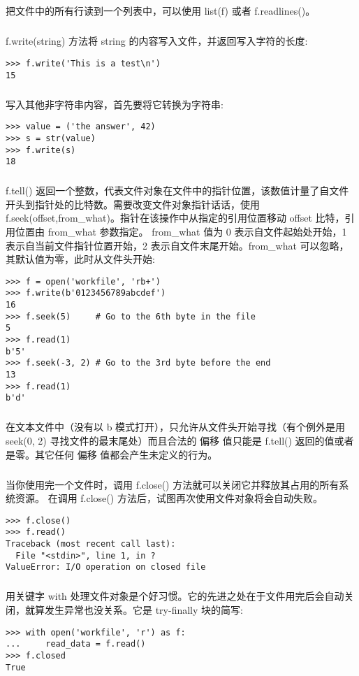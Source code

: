 \documentclass{article}
\begin{document}
\begin{CJK}{UTF8}{gbsn}
\begin{verbatim}
\end{verbatim}
\subparagraph*{}
把文件中的所有行读到一个列表中，可以使用 list(f) 或者 f.readlines()。
\subparagraph*{}
f.write(string) 方法将 string 的内容写入文件，并返回写入字符的长度:
\begin{verbatim}
>>> f.write('This is a test\n')
15
\end{verbatim}
\subparagraph*{}
写入其他非字符串内容，首先要将它转换为字符串:
\begin{verbatim}
>>> value = ('the answer', 42)
>>> s = str(value)
>>> f.write(s)
18
\end{verbatim}
\subparagraph*{}
f.tell() 返回一个整数，代表文件对象在文件中的指针位置，该数值计量了自文件开头到指针处的比特数。需要改变文件对象指针话话，使用 f.seek(offset,from\_{}what)。指针在该操作中从指定的引用位置移动 offset 比特，引用位置由 from\_{}what 参数指定。 from\_{}what 值为 0 表示自文件起始处开始，1 表示自当前文件指针位置开始，2 表示自文件末尾开始。from\_{}what 可以忽略，其默认值为零，此时从文件头开始:
\begin{verbatim}
>>> f = open('workfile', 'rb+')
>>> f.write(b'0123456789abcdef')
16
>>> f.seek(5)     # Go to the 6th byte in the file
5
>>> f.read(1)
b'5'
>>> f.seek(-3, 2) # Go to the 3rd byte before the end
13
>>> f.read(1)
b'd'
\end{verbatim}
\subparagraph*{}
在文本文件中（没有以 b 模式打开），只允许从文件头开始寻找（有个例外是用 seek(0, 2) 寻找文件的最末尾处）而且合法的 偏移 值只能是 f.tell() 返回的值或者是零。其它任何 偏移 值都会产生未定义的行为。
\subparagraph*{}
当你使用完一个文件时，调用 f.close() 方法就可以关闭它并释放其占用的所有系统资源。 在调用 f.close() 方法后，试图再次使用文件对象将会自动失败。
\begin{verbatim}
>>> f.close()
>>> f.read()
Traceback (most recent call last):
  File "<stdin>", line 1, in ?
ValueError: I/O operation on closed file
\end{verbatim}
\subparagraph*{}
用关键字 with 处理文件对象是个好习惯。它的先进之处在于文件用完后会自动关闭，就算发生异常也没关系。它是 try-finally 块的简写:
\begin{verbatim}
>>> with open('workfile', 'r') as f:
...     read_data = f.read()
>>> f.closed
True
\end{verbatim}

\end{CJK}
\end{document}
